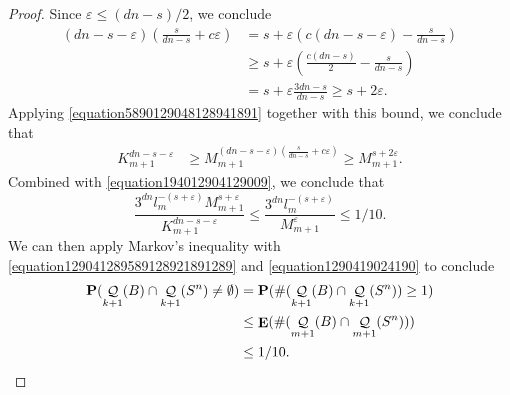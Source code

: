\documentclass[12pt,reqno]{article}
\DeclareMathOperator{\EE}{\mathbf{E}}
\DeclareMathOperator{\DQ}{\mathcal{Q}}
\begin{document}
\begin{proof}
    Since $\varepsilon \leq (dn - s)/2$, we conclude
    \begin{align*}
        \left( dn - s - \varepsilon \right) \left( \frac{s}{dn - s} + c\varepsilon \right) &= s + \varepsilon \left( c(dn - s - \varepsilon) - \frac{s}{dn - s} \right)\\
        &\geq s + \varepsilon \left( \frac{c(dn - s)}{2} - \frac{s}{dn - s} \right)\\
        &= s + \varepsilon \frac{3dn - s}{dn - s} \geq s + 2\varepsilon.
    \end{align*}
    Applying \eqref{equation5890129048128941891} together with this bound, we conclude that
    \begin{align*}
        K_{m+1}^{dn - s - \varepsilon} &\geq M_{m+1}^{(dn - s - \varepsilon) \left( \frac{s}{dn - s} + c\varepsilon \right)} \geq M_{m+1}^{s + 2 \varepsilon}.
    \end{align*}
    Combined with \eqref{equation194012904129009}, we conclude that
    \begin{equation} \label{equation1290419024190}
        \frac{3^{dn} l_m^{-(s + \varepsilon)} M_{m+1}^{s + \varepsilon}}{K_{m+1}^{dn - s - \varepsilon}} \leq \frac{3^{dn} l_m^{-(s + \varepsilon)}}{M_{m+1}^\varepsilon} \leq 1/10.
    \end{equation}
    We can then apply Markov's inequality with \eqref{equation129041289589128921891289} and \eqref{equation1290419024190} to conclude
    \begin{equation} \label{fourierdim2}
    \begin{split}
        \mathbf{P}(\DQ_{k+1}(B) \cap \DQ_{k+1}(S^n) \neq \emptyset) &= \mathbf{P}(\# (\DQ_{k+1}(B) \cap \DQ_{k+1}(S^n)) \geq 1)\\
        &\leq \EE(\#(\DQ_{m+1}(B) \cap \DQ_{m+1}(S^n)))\\
        &\leq 1/10. \qedhere
    \end{split}
    \end{equation}
\end{proof}
\end{document}
